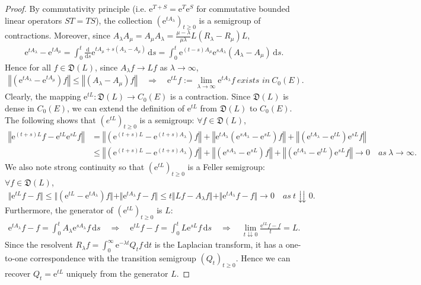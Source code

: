 \documentclass{article}
\numberwithin{equation}{section}
\newcommand{\e}{\mathrm{e}}
\renewcommand{\d}{\mathrm{d}}
\theoremstyle{plain}
\theoremstyle{definition}
\begin{document}
\begin{proof}
By commutativity principle (i.e. $\e^{T+S}=\e^T\e^S$ for commutative bounded linear operators $ST=TS$), the collection $(\e^{tA_\lambda})_{t\geq 0}$ is a semigroup of contractions. Moreover, since $A_\lambda A_\mu=A_\mu A_\lambda = \frac{\mu-\lambda}{\mu\lambda}L(R_\lambda-R_\mu)L$,
\begin{align*}
	\e^{tA_\lambda}-\e^{tA_\mu}=\int_0^t\frac{\d}{\d s}\e^{tA_\mu+s(A_\lambda-A_\mu)}\,\d s=\int_0^t\e^{(t-s)A_\mu}\e^{sA_\lambda}(A_\lambda-A_\mu)\,\d s.
\end{align*}
Hence for all $f\in\mathfrak{D}(L)$, since $A_\lambda f\to Lf$ as $\lambda\to\infty$,
\begin{align*}
	\left\Vert\left(\e^{tA_\lambda}-\e^{tA_\mu}\right)f\right\Vert\leq\left\Vert (A_\lambda-A_\mu)f\right\Vert\quad\Rightarrow\quad \e^{tL}f:=\lim_{\lambda\to\infty}\e^{tA_\lambda}f\ \textit{exists in}\ C_0(E).
\end{align*}
Clearly, the mapping $\e^{tL}:\mathfrak{D}(L)\to C_0(E)$ is a contraction. Since $\mathfrak{D}(L)$ is dense in $C_0(E)$, we can extend the definition of $\e^{tL}$ from $\mathfrak{D}(L)$ to $C_0(E)$. The following shows that $(e^{tL})_{t\geq 0}$ is a semigroup: $\forall f\in\mathfrak{D}(L)$,
\begin{align*}
	\left\Vert\e^{(t+s)L}f-\e^{tL}\e^{sL}f\right\Vert &= \left\Vert(\e^{(t+s)L}-\e^{(t+s)A_\lambda})f\right\Vert + \left\Vert\e^{tA_\lambda}(\e^{sA_\lambda}-\e^{sL})f\right\Vert + \left\Vert(\e^{tA_\lambda}-\e^{tL})\e^{sL}f\right\Vert\\
	&\leq\left\Vert(\e^{(t+s)L}-\e^{(t+s)A_\lambda})f\right\Vert + \left\Vert(\e^{sA_\lambda}-\e^{sL})f\right\Vert + \left\Vert(\e^{tA_\lambda}-\e^{tL})\e^{sL}f\right\Vert\to 0\quad\textit{as}\ \lambda\to\infty.
\end{align*}
We also note strong continuity so that $(\e^{tL})_{t\geq 0}$ is a Feller semigroup: $\forall f\in\mathfrak{D}(L)$,
\begin{align*}
\Vert \e^{tL}f-f\Vert \leq \Vert(\e^{tL}-\e^{tA_\lambda})f\Vert + \Vert\e^{tA_\lambda}f-f\Vert\leq t\Vert Lf-A_\lambda f\Vert + \Vert\e^{tA_\lambda}f-f\Vert \to 0\quad\textit{as}\ t\downdownarrows 0.
\end{align*}
Furthermore, the generator of $(\e^{tL})_{t\geq 0}$ is $L$:
\begin{align*}
	\e^{tA_\lambda}f - f = \int_0^tA_\lambda\e^{sA_\lambda}f\,\d s\quad\Rightarrow\quad\e^{tL}f-f=\int_0^t L\e^{sL}f\,\d s\quad\Rightarrow\quad \lim_{t\downdownarrows 0}\frac{\e^{tL}f-f}{t} = L.
\end{align*}
Since the resolvent $R_\lambda f=\int_0^\infty \e^{-\lambda t}Q_tf\,\d t$ is the Laplacian transform, it has a one-to-one correspondence with the transition semigroup $(Q_t)_{t\geq 0}$. Hence we can recover $Q_t=\e^{tL}$ uniquely from the generator $L$.
\end{proof}
\end{document}
